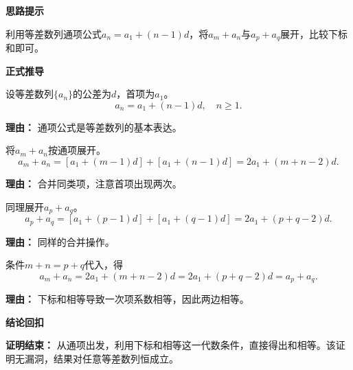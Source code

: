 \begin{proofbox}
\textbf{\textcolor{CProof}{思路提示}}

利用等差数列通项公式$a_n = a_1 + (n-1)d$，将$a_m+a_n$与$a_p+a_q$展开，比较下标和即可。

\medskip
\textbf{\textcolor{CProof}{正式推导}}
\begin{description}[style=nextline, leftmargin=2.8em, labelsep=0.5em, itemsep=0.55em]
    \item[\textbf{步骤一（设公差）：}] 设等差数列$\{a_n\}$的公差为$d$，首项为$a_1$。
    \[
    a_n = a_1 + (n-1)d,\quad n\ge 1.
    \]
    \par\textbf{理由：} 通项公式是等差数列的基本表达。

    \item[\textbf{步骤二（展开左边）：}] 将$a_m+a_n$按通项展开。
    \[
    a_m+a_n = [a_1+(m-1)d] + [a_1+(n-1)d] = 2a_1 + (m+n-2)d.
    \]
    \par\textbf{理由：} 合并同类项，注意首项出现两次。

    \item[\textbf{步骤三（展开右边）：}] 同理展开$a_p+a_q$。
    \[
    a_p+a_q = [a_1+(p-1)d] + [a_1+(q-1)d] = 2a_1 + (p+q-2)d.
    \]
    \par\textbf{理由：} 同样的合并操作。

    \item[\textbf{步骤四（利用条件）：}] 条件$m+n=p+q$代入，得
    \[
    a_m+a_n = 2a_1 + (m+n-2)d = 2a_1 + (p+q-2)d = a_p+a_q.
    \]
    \par\textbf{理由：} 下标和相等导致一次项系数相等，因此两边相等。
\end{description}

\medskip
\textbf{\textcolor{CProof}{结论回扣}}

\textbf{证明结束：} 从通项出发，利用下标和相等这一代数条件，直接得出和相等。该证明无漏洞，结果对任意等差数列恒成立。
\end{proofbox}

